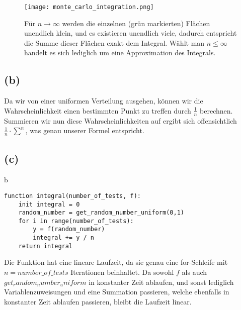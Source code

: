 \documentclass[a4paper]{scrartcl}
\begin{document}
\begin{figure}[h]
	\texttt{[image: monte\_carlo\_integration.png]}
	\caption{Für $n \rightarrow \infty$ werden die einzelnen (grün markierten) Flächen unendlich klein, und es existieren unendlich viele, dadurch entspricht die Summe dieser Flächen exakt dem Integral. Wählt man $n \leq \infty$ handelt es sich lediglich um eine Approximation des Integrals.}
\end{figure}


\subsection*{(b)}
Da wir von einer uniformen Verteilung ausgehen, können wir die Wahrscheinlichkeit einen bestimmten Punkt zu treffen durch $\frac{1}{n}$ berechnen.\\ 
Summieren wir nun diese Wahrscheinlichkeiten auf ergibt sich offensichtlich $\frac{1}{n} \cdot \sum_{}^{n}$, was genau unserer Formel entspricht.



\subsection*{(c)}b
\begin{lstlisting}
function integral(number_of_tests, f):
	init integral = 0
	random_number = get_random_number_uniform(0,1)
	for i in range(number_of_tests):
		y = f(random_number)
		integral += y / n
	return integral
\end{lstlisting}
Die Funktion hat eine lineare Laufzeit, da sie genau eine for-Schleife mit $n = number\_of\_tests$ Iterationen beinhaltet. Da sowohl $f$ als auch $get_random_number_uniform$ in konstanter Zeit ablaufen, und sonst lediglich Variablenzuweisungen und eine Summation passieren, welche ebenfalls in konstanter Zeit ablaufen passieren, bleibt die Laufzeit linear.
\end{document}
